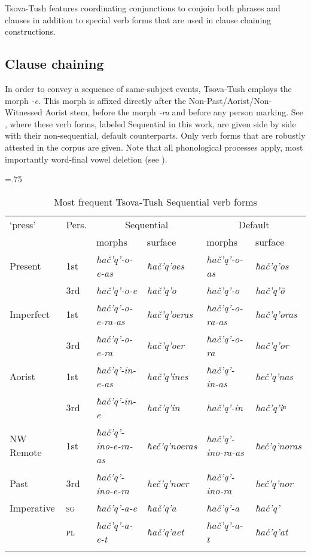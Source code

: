 Tsova-Tush features coordinating conjunctions to conjoin both phrases and clauses in addition to special verb forms that are used in clause chaining constructions.

\subsection{Clause chaining} \label{chaining}


In order to convey a sequence of same-subject events, Tsova-Tush employs the morph \textit{-e}. This morph is affixed directly after the Non-Past/Aorist/Non-Witnessed Aorist stem, before the morph \textit{-ra} and before any person marking. See , where these verb forms, labeled Sequential in this work, are given side by side with their non-sequential, default counterparts. Only verb forms that are robustly attested in the corpus are given. Note that all phonological processes apply, most importantly word-final vowel deletion (see ).

\begin{table}
	\small
	\tabcolsep=.75\tabcolsep
	\begin{tabular}{ll ll ll}
    \lsptoprule
		`press' & Pers. & \multicolumn{2}{c}{{Sequential}} & \multicolumn{2}{c}{{Default}} \\\cmidrule(lr){3-4}\cmidrule(lr){5-6}
		& & {morphs} & {surface} & {morphs} & {surface}\\
        \midrule
		Present & 1st  & \textit{ħač'q'-o-e-as} & \textit{ħač'q'oes} & \textit{ħač'q'-o-as} & \textit{ħač'q'os} \\
		& 3rd  & \textit{ħač'q'-o-e} & \textit{ħač'q'o} & \textit{ħač'q'-o} & \textit{ħač'q'\u{o}} \\
		Imperfect & 1st  & \textit{ħač'q'-o-e-ra-as} & \textit{ħač'q'oeras} & \textit{ħač'q'-o-ra-as} & \textit{ħač'q'oras} \\
		& 3rd  & \textit{ħač'q'-o-e-ra} & \textit{ħač'q'oer} & \textit{ħač'q'-o-ra} & \textit{ħač'q'or} \\
		Aorist & 1st  & \textit{ħač'q'-in-e-as} & \textit{ħač'q'ines} & \textit{ħač'q'-in-as} & \textit{ħeč'q'nas} \\
		& 3rd  &\textit{ħač'q'-in-e} & \textit{ħač'q'in} & \textit{ħač'q'-in} & \textit{ħač'q'iⁿ} \\
		NW Remote  & 1st  & \textit{ħač'q'-ino-e-ra-as} & \textit{ħeč'q'noeras} & \textit{ħač'q'-ino-ra-as} & \textit{ħeč'q'noras} \\
		\quad Past & 3rd  & \textit{ħač'q'-ino-e-ra} & \textit{ħeč'q'noer} & \textit{ħač'q'-ino-ra} & \textit{ħeč'q'nor} \\
		Imperative & \textsc{sg} & \textit{ħač'q'-a-e} & \textit{ħač'q'a} & \textit{ħač'q'-a} & \textit{ħač'q'} \\
		& \textsc{pl} & \textit{ħač'q'-a-e-t} & \textit{ħač'q'aet} & \textit{ħač'q'-a-t} & \textit{ħač'q'at} \\
		\lspbottomrule
	\end{tabular}
	\caption{Most frequent Tsova-Tush Sequential verb forms}
	\label{table-sequential}
\end{table}

